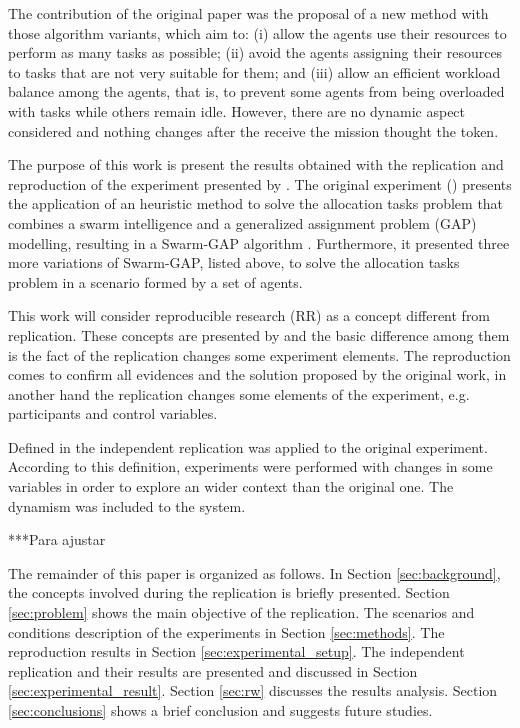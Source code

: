 The contribution of the original paper was the proposal of a new method with those algorithm variants, which aim to: (i) allow the agents use their resources to perform as many tasks as possible; (ii) avoid the agents assigning their resources to tasks that are not very suitable for them; and (iii) allow an efficient workload balance among the agents, that is, to prevent some agents from being overloaded with tasks while others remain idle. However, there are no dynamic aspect considered and nothing changes after the \uavs receive the mission thought the token.

The purpose of this work is present the results obtained with the replication and reproduction of the experiment presented by \cite{MAS07}. The original experiment (\cite{MAS07}) presents the application of an heuristic method to solve the allocation tasks problem that combines a swarm intelligence and a generalized assignment problem (GAP) modelling, resulting in a Swarm-GAP algorithm \cite{ferreira2007swarm}. Furthermore, it presented three more variations of Swarm-GAP, listed above, to solve the allocation tasks problem in a scenario formed by a set of agents.

This work will consider reproducible research (RR) as a concept different from replication. These concepts are presented by \cite{exp02} and the basic difference among them is the fact of the replication changes some experiment elements. The reproduction comes to confirm all evidences and the solution proposed by the original work, in another hand the replication changes some elements of the experiment, e.g. participants and control variables.

Defined in \cite{exp03} the independent replication was applied to the original experiment. According to this definition, experiments were performed with changes in some variables in order to explore an wider context than the original one.  The dynamism was included to the system. 

***Para ajustar

The remainder of this paper is organized as follows. In Section \ref{sec:background}, the concepts involved during the replication is briefly  presented. Section \ref{sec:problem} shows the main objective of the replication. The scenarios and conditions description of the experiments in Section \ref{sec:methods}. The reproduction results in Section \ref{sec:experimental_setup}. The independent replication and their results are presented and discussed in Section \ref{sec:experimental_result}. Section \ref{sec:rw} discusses the results analysis. Section \ref{sec:conclusions} shows a brief conclusion and suggests future studies.